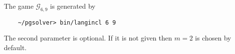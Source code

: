 The game $\mathcal{G}_{6,9}$ is generated by
\begin{verbatim}
    ~/pgsolver> bin/langincl 6 9
\end{verbatim}
The second parameter is optional. If it is not given then $m=2$ is chosen by default.

